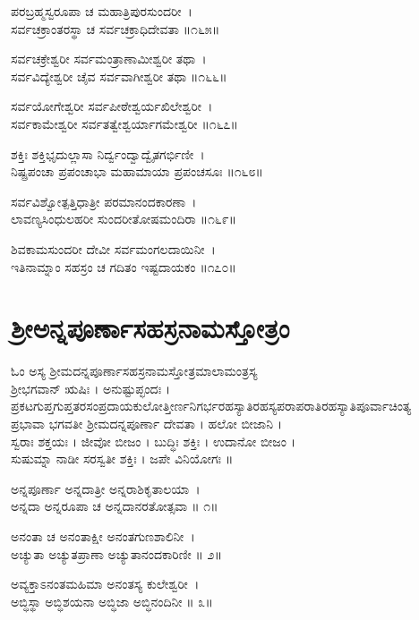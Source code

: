 ಪರಬ್ರಹ್ಮಸ್ವರೂಪಾ ಚ ಮಹಾತ್ರಿಪುರಸುಂದರೀ~।\\
ಸರ್ವಚಕ್ರಾಂತರಸ್ಥಾ ಚ ಸರ್ವಚಕ್ರಾಧಿದೇವತಾ ॥೧೬೫॥

	ಸರ್ವಚಕ್ರೇಶ್ವರೀ ಸರ್ವಮಂತ್ರಾಣಾಮೀಶ್ವರೀ ತಥಾ~।\\
	ಸರ್ವವಿದ್ಯೇಶ್ವರೀ ಚೈವ ಸರ್ವವಾಗೀಶ್ವರೀ ತಥಾ ॥೧೬೬॥

ಸರ್ವಯೋಗೇಶ್ವರೀ ಸರ್ವಪೀಠೇಶ್ವರ್ಯಖಿಲೇಶ್ವರೀ~।\\
ಸರ್ವಕಾಮೇಶ್ವರೀ ಸರ್ವತತ್ವೇಶ್ವರ್ಯಾಗಮೇಶ್ವರೀ ॥೧೬೭॥

	ಶಕ್ತಿಃ ಶಕ್ತಿಭೃದುಲ್ಲಾಸಾ ನಿರ್ದ್ವಂದ್ವಾದ್ವೈತಗರ್ಭಿಣೀ~।\\
	ನಿಷ್ಪ್ರಪಂಚಾ ಪ್ರಪಂಚಾಭಾ ಮಹಾಮಾಯಾ ಪ್ರಪಂಚಸೂಃ ॥೧೬೮॥

ಸರ್ವವಿಶ್ವೋತ್ಪತ್ತಿಧಾತ್ರೀ ಪರಮಾನಂದಕಾರಣಾ~।\\
ಲಾವಣ್ಯಸಿಂಧುಲಹರೀ ಸುಂದರೀತೋಷಮಂದಿರಾ ॥೧೬೯॥

	ಶಿವಕಾಮಸುಂದರೀ ದೇವೀ ಸರ್ವಮಂಗಲದಾಯಿನೀ~।\\
	ಇತಿನಾಮ್ನಾಂ ಸಹಸ್ರಂ ಚ ಗದಿತಂ ಇಷ್ಟದಾಯಕಂ ॥೧೭೦॥
\section{ ಶ್ರೀಅನ್ನಪೂರ್ಣಾಸಹಸ್ರನಾಮಸ್ತೋತ್ರಂ }
ಓಂ ಅಸ್ಯ ಶ್ರೀಮದನ್ನಪೂರ್ಣಾಸಹಸ್ರನಾಮಸ್ತೋತ್ರಮಾಲಾಮಂತ್ರಸ್ಯ\\ ಶ್ರೀಭಗವಾನ್ ಋಷಿಃ । ಅನುಷ್ಟುಪ್ಛಂದಃ । ಪ್ರಕಟಗುಪ್ತಗುಪ್ತತರಸಂಪ್ರದಾಯಕುಲೋತ್ತೀರ್ಣನಿಗರ್ಭರಹಸ್ಯಾತಿರಹಸ್ಯಪರಾಪರಾತಿರಹಸ್ಯಾತಿಪೂರ್ವಾಚಿಂತ್ಯ\\ಪ್ರಭಾವಾ ಭಗವತೀ ಶ್ರೀಮದನ್ನಪೂರ್ಣಾ ದೇವತಾ । ಹಲೋ ಬೀಜಾನಿ । \\ಸ್ವರಾಃ ಶಕ್ತಯಃ । ಜೀವೋ ಬೀಜಂ । ಬುದ್ಧಿಃ ಶಕ್ತಿಃ । ಉದಾನೋ ಬೀಜಂ ।\\ ಸುಷುಮ್ನಾ ನಾಡೀ ಸರಸ್ವತೀ ಶಕ್ತಿಃ । ಜಪೇ ವಿನಿಯೋಗಃ ॥

\newpage
ಅನ್ನಪೂರ್ಣಾ ಅನ್ನದಾತ್ರೀ ಅನ್ನರಾಶಿಕೃತಾಲಯಾ~।\\
ಅನ್ನದಾ ಅನ್ನರೂಪಾ ಚ ಅನ್ನದಾನರತೋತ್ಸವಾ ॥ ೧॥

ಅನಂತಾ ಚ ಅನಂತಾಕ್ಷೀ ಅನಂತಗುಣಶಾಲಿನೀ~।\\
ಅಚ್ಯುತಾ ಅಚ್ಯುತಪ್ರಾಣಾ ಅಚ್ಯುತಾನಂದಕಾರಿಣೀ ॥ ೨॥

ಅವ್ಯಕ್ತಾಽನಂತಮಹಿಮಾ ಅನಂತಸ್ಯ ಕುಲೇಶ್ವರೀ~।\\
ಅಬ್ಧಿಸ್ಥಾ ಅಬ್ಧಿಶಯನಾ ಅಬ್ಧಿಜಾ ಅಬ್ಧಿನಂದಿನೀ ॥ ೩॥

